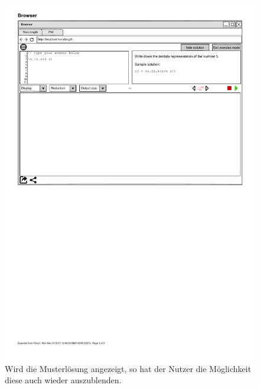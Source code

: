 \documentclass[parskip=full,11pt,twoside]{scrartcl}
\begin{document}
\begin{figure}[H]
	\centering
	\includegraphics[width=\textwidth]{img/exerciseModeSolution}
	\caption{\label{fig:showSolution}Wird die Musterlösung angezeigt, so hat der Nutzer die Möglichkeit diese auch wieder auszublenden.}
\end{figure}
\end{document}
